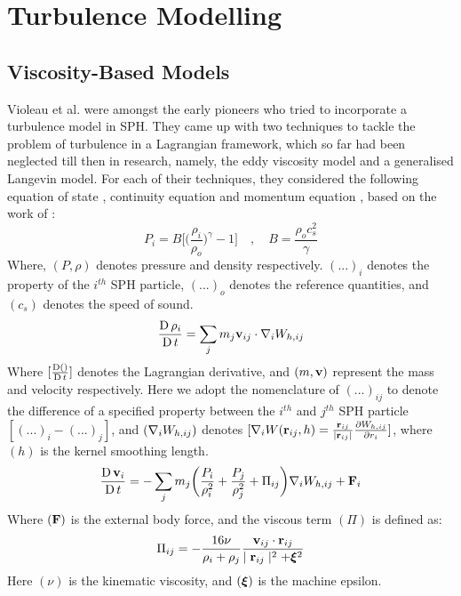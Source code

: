 
\chapter{Turbulence Modelling} %

\label{chap:turbulence-modelling}
\section{Viscosity-Based Models}
Violeau et al. \parencite{VIOLEAU2002} were amongst the early pioneers who tried to incorporate a turbulence model in SPH. They came up with two techniques to tackle the problem of turbulence in a Lagrangian framework, which so far had been neglected till then in research, namely, the eddy viscosity model and a generalised Langevin model. For each of their techniques, they considered the following equation of state , continuity equation  and momentum equation , based on the work of \parencite{Monaghan1992}:   
\begin{equation}
    P_i = B \Bigg[ \bigg( \frac{\rho_i}{\rho_o} \bigg)^{\gamma} - 1 \Bigg] \quad , \quad B = \frac{\rho_o c_s^2}{\gamma}
    \label{eq:violeau-eos}
\end{equation}
Where, $(P, \rho)$ denotes pressure and density respectively. $(...)_i$ denotes the property of the $i^{th}$ SPH particle, $(...)_o$ denotes the reference quantities, and $(c_s)$ denotes the speed of sound.
\begin{equation}
    \LagDerivative{\rho_i} = \sum_j m_j \VIJ \cdot \DWIJ
    \label{eq:violeau-continuity}
\end{equation}
Where $[\LagDerivative{()}]$ denotes the Lagrangian derivative, and $(m, \vect{v})$ represent the mass and velocity respectively. Here we adopt the nomenclature of $(...)_{ij}$ to denote the difference of a specified property between the $i^{th}$ and $j^{th}$ SPH particle $[(...)_{i} - (...)_{j}]$, and $(\DWIJ)$ denotes $[\nabla_i W(\RIJ,h) = \frac{\RIJ}{\RtwoIJ[]} \PartialDerivative[r_i]{\WIJ}]$, where $(h)$ is the kernel smoothing length.
\begin{equation}
    \LagDerivative{\vect{v}_i} = - \sum_j m_j \bigg( \frac{P_i}{\rho_i^2} + \frac{P_j}{\rho_j^2} + \Pi_{ij} \bigg) \DWIJ + \vect{F}_i
    \label{eq:violeau-mom}
\end{equation}
Where $(\vect{F})$ is the external body force, and the viscous term $(\Pi)$ is defined as:
\begin{equation}
    \Pi_{ij} = - \frac{16\nu}{\rho_i + \rho_j} \frac{\VIJ \cdot \RIJ}{\RtwoIJ + \MachineEpsilon^2} 
    \label{eq:violeau-diffusion-term}
\end{equation}
Here $(\nu)$ is the kinematic viscosity, and $(\MachineEpsilon)$ is the machine epsilon.


